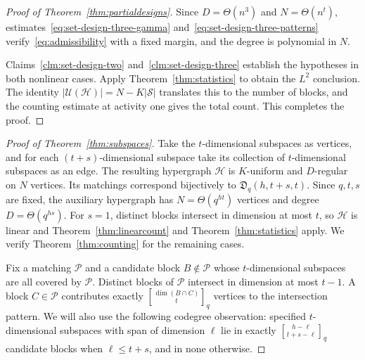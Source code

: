 \documentclass[11pt,reqno]{amsart}
\makeatletter
\numberwithin{equation}{section}
\theoremstyle{plain}
\newenvironment{claimproof}[1][Proof]{\par
    \pushQED{\qed}%
    \renewcommand{\qedsymbol}{$\blacksquare$}
    \normalfont \topsep6\p@\@plus6\p@\relax
    \trivlist
    \item[\hskip\labelsep
    \textit{#1}\@addpunct{.}~]\ignorespaces
}{%
    \popQED\endtrivlist\@endpefalse
}
\theoremstyle{definition}
\newcommand{\calH}{\mathcal{H}}
\newcommand{\calP}{\mathcal{P}}
\newcommand{\calS}{\mathcal{S}}
\newcommand{\calU}{\mathcal U}
\newcommand{\qbinom}[2]{\genfrac{[}{]}{0pt}{}{#1}{#2}_q}
\makeatother
\begin{document}
\begin{proof}[Proof of Theorem~\ref{thm:partialdesigns}]
\begin{claimproof}[Proof of Claim~\ref{clm:set-design-three}]
    Since $D=\Theta(n^3)$ and $N=\Theta(n^t)$, estimates~\eqref{eq:set-design-three-gamma} and~\eqref{eq:set-design-three-patterns} verify~\eqref{eq:admissibility} with a fixed margin, and the degree is polynomial in $N$.
    \end{claimproof}

    Claims~\ref{clm:set-design-two} and~\ref{clm:set-design-three} establish the hypotheses in both nonlinear cases.
    Apply Theorem~\ref{thm:statistics} to obtain the $L^2$ conclusion.
    The identity $|\calU(\calH)|=N-K|\calS|$ translates this to the number of blocks, and the counting estimate at activity one gives the total count.
    This completes the proof.
\end{proof}

\begin{proof}[Proof of Theorem~\ref{thm:subspaces}]
    Take the $t$-dimensional subspaces as vertices, and for each $(t+s)$-dimensional subspace take its collection of $t$-dimensional subspaces as an edge.
    The resulting hypergraph $\calH$ is $K$-uniform and $D$-regular on $N$ vertices.
    Its matchings correspond bijectively to $\mathfrak D_q(h,t+s,t)$.
    Since $q,t,s$ are fixed, the auxiliary hypergraph has $N=\Theta(q^{ht})$ vertices and degree $D=\Theta(q^{hs})$.
    For $s=1$, distinct blocks intersect in dimension at most $t$, so $\calH$ is linear and Theorem~\ref{thm:linearcount} and Theorem~\ref{thm:statistics} apply.
    We verify Theorem~\ref{thm:counting} for the remaining cases.

    Fix a matching $\calP$ and a candidate block $B\notin\calP$ whose $t$-dimensional subspaces are all covered by $\calP$.
    Distinct blocks of $\calP$ intersect in dimension at most $t-1$.
    A block $C\in\calP$ contributes exactly $\qbinom{\dim(B\cap C)}t$ vertices to the intersection pattern.
    We will also use the following codegree observation: specified $t$-dimensional subspaces with span of dimension $\ell$ lie in exactly $\qbinom{h-\ell}{t+s-\ell}$ candidate blocks when $\ell\le t+s$, and in none otherwise.


\end{proof}
\end{document}
